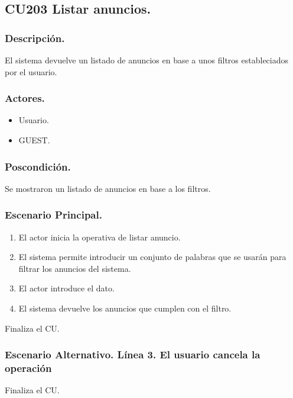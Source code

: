 \subsection{CU203 Listar anuncios.}
\subsubsection{Descripci\'{o}n.}
El sistema devuelve un listado de anuncios en base a unos filtros estableciados por el usuario.
\subsubsection{Actores.}
\begin{itemize}
\item Usuario.
\item GUEST.
\end{itemize}
\subsubsection{Poscondici\'{o}n.}
Se mostraron un listado de anuncios en base a los filtros.
\subsubsection{Escenario Principal.}
\begin{enumerate}
\item El actor inicia la operativa de listar anuncio.
\item El sistema permite introducir un conjunto de palabras que se usar\'{a}n para filtrar los anuncios del sistema.
\item El actor introduce el dato.
\item El sistema devuelve los anuncios que cumplen con el filtro.
\end{enumerate}
Finaliza el CU.
\subsubsection{Escenario Alternativo. L\'{i}nea 3. El usuario cancela la operaci\'{o}n}
Finaliza el CU.